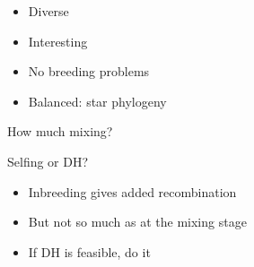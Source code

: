 \documentclass[12pt]{article}
\newcommand{\headsize}{\fontsize{35}{35} \selectfont}
\newcommand{\smallsize}{\fontsize{25}{30} \selectfont}
\begin{document}
{\vspace{25mm}

\color{mywhite}
\smallsize

\hfill \begin{minipage}{10in}
\begin{itemize}
\itemsep24pt
\item Diverse
\item Interesting
\item No breeding problems
\item Balanced: star phylogeny
\end{itemize}
\end{minipage}


\newpage


\headsize \color{myyellow}
\hfill \begin{minipage}{5.75in}
\centering
How much mixing?
\end{minipage}

\vspace{25mm}

\color{mywhite}
\smallsize



\newpage


\headsize \color{myyellow}
\hfill \begin{minipage}{5.75in}
\centering
Selfing or DH?
\end{minipage}

\vspace{25mm}

\color{mywhite}
\smallsize

\hfill \begin{minipage}{10in}
\begin{itemize}
\itemsep24pt
\item Inbreeding gives added recombination
\item But not so much as at the mixing stage
\color{myblue}
\item If DH is feasible, do it
\end{itemize}
\end{minipage}



}
\end{document}
